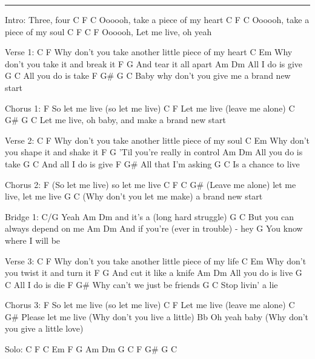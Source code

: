 \noindent\rule{\columnwidth}{1pt}
\begin{multicols}{2}
\begin{lstsong}
Intro:
Three, four
C    F                     C
Oooooh, take a piece of my heart 
C    F                     C
Oooooh, take a piece of my soul 
C    F          C        F
Oooooh, Let me live, oh yeah 

Verse 1:
              C                             F
Why don't you take another little piece of my heart 
              C           Em
Why don't you take it and break it 
    F           G
And tear it all apart 
Am           Dm
All I do is give 
G             C
All you do is take 
F        G#                  G         C
Baby why don't you give me a brand new start

Chorus 1:
          F
So let me live (so let me live) 
C      F
Let me live (leave me alone) 
C      G#                        G         C
Let me live, oh baby, and make a brand new start 

Verse 2:
              C                            F
Why don't you take another little piece of my soul 
              C              Em
Why don't you shape it and shake it 
      F                    G
'Til you're really in control 
Am            Dm
All you do is take 
    G            C
And all I do is give 
F            G#
All that I'm asking 
     G         C
Is a chance to live
\end{lstsong}
\columnbreak
\begin{lstsong}
Chorus 2:
            F
(So let me live) so let me live 
 C          F                 C      G#
(Leave me alone) let me live, let me live 
                              G         C
(Why don't you let me make) a brand new start

Bridge 1:
C/G
Yeah 
            Am        Dm
and it's a (long hard struggle)
            G                C 
But you can always depend on me 
               Am       Dm
And if you're (ever in trouble) - hey 
    G
You know where I will be

Verse 3:
              C                             F
Why don't you take another little piece of my life 
              C            Em
Why don't you twist it and turn it 
    F              G
And cut it like a knife 
Am            Dm
All you do is live 
G           C
All I do is die 
F            G# 
Why can't we just be friends 
     G        C
Stop livin' a lie 

Chorus 3:
          F
So let me live (so let me live) 
C      F
Let me live (leave me alone) 
  C           G#
Please let me live (Why don't you live a little) 
         Bb
Oh yeah baby (Why don't you give a little love) 
\end{lstsong}
\columnbreak
\begin{lstsong}
Solo:
C F 
C Em F G
Am Dm G C
F G# G C


\end{lstsong}
\end{multicols}
